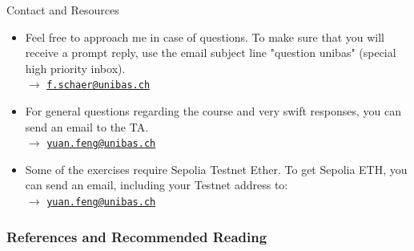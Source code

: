 \documentclass[handout]{beamer}
\begin{document}
\begin{frame}{Contact and Resources}
\begin{itemize}
	\item<1-> Feel free to approach me in case of questions. To make sure that you will receive a prompt reply, use the email subject line "question unibas" (special high priority inbox). \\ $\rightarrow$ \href{mailto:f.schaer@unibas.ch?subject=question unibas}{\texttt{f.schaer@unibas.ch}}
	\item<2-> For general questions regarding the course and very swift responses, you can send an email to the TA. \\$\rightarrow$ \href{mailto:yuan.feng@unibas.ch?subject=question unibas}{\texttt{yuan.feng@unibas.ch}}
	\item<3-> Some of the exercises require Sepolia Testnet Ether. To get Sepolia ETH, you can send an email, including your Testnet address to: \\
	$\rightarrow$ \href{mailto:yuan.feng@unibas.ch?subject=Sepolia Test Funds}{\texttt{yuan.feng@unibas.ch}}
\end{itemize}
\end{frame}


\begin{frame}%
\frametitle{References and Recommended Reading}
	
	
\end{frame}
\end{document}
